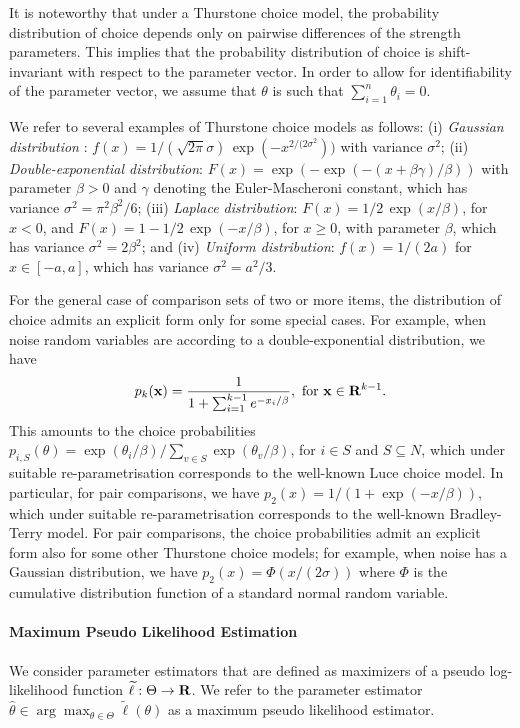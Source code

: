 It is noteworthy that under a Thurstone choice model, the probability distribution of choice depends only on pairwise differences of the strength parameters. This implies that the probability distribution of choice is shift-invariant with respect to the parameter vector. In order to allow for identifiability of the parameter vector, we assume that $\theta$ is such that $\sum_{i=1}^n \theta_i =0$.

We refer to several examples of Thurstone choice models as follows: (i) \emph{Gaussian distribution}  : $f(x) = 1/(\sqrt{2\pi}\sigma)\, \exp(-x^{2/(2\sigma^2}))$ with variance $\sigma^2$; (ii) \emph{Double-exponential distribution}: $F(x) = \exp(-\exp(-(x+\beta\gamma)/\beta))$ with parameter $\beta > 0$ and $\gamma$ denoting the Euler-Mascheroni constant, which has variance $\sigma^2 = \pi^2 \beta^2/6$; (iii) \emph{Laplace distribution}: $F(x) = 1/2\,\exp(x/\beta)$, for $x<0$, and $F(x) = 1-1/2\, \exp(-x/\beta)$, for $x \geq 0$, with parameter $\beta$, which has variance $\sigma^2 = 2 \beta^2$; and (iv) \emph{Uniform distribution}: $f(x) = 1/(2a)$ for $x\in [-a,a]$, which has variance $\sigma^2 = a^2/3$.

For the general case of comparison sets of two or more items, the distribution of choice admits an explicit form only for some special cases. For example, when noise random variables are according to a double-exponential distribution, we have
$$
p_k(\mathbf{x}) = \frac{1}{1+\sum_{i=1}^{k-1}e^{-x_i/\beta}}, \hbox{ for } \mathbf{x} \in \mathbf{R}^{k-1}.
$$
This amounts to the choice probabilities $p_{i,S}(\theta) = \exp(\theta_i/\beta)/\sum_{v\in S} \exp(\theta_v/\beta)$, for $i \in S$ and $S\subseteq N$, which under suitable re-parametrisation corresponds to the well-known Luce choice model. In particular, for pair comparisons, we have $p_2(x) = 1/(1+\exp(-x/\beta))$, which under suitable re-parametrisation corresponds to the well-known Bradley-Terry model. For pair comparisons, the choice probabilities admit an explicit form also for some other Thurstone choice models; for example, when noise has a Gaussian distribution, we have $p_2(x) = \Phi(x/(2\sigma))$ where $\Phi$ is the cumulative distribution function of a standard normal random variable. 

\paragraph{Maximum Pseudo Likelihood Estimation} We consider parameter estimators that are defined as maximizers of a pseudo log-likelihood function $\widetilde{\ell}: \Theta \rightarrow \mathbf{R}$. We refer to the parameter estimator $\widehat{\theta}\in \arg\max_{\theta \in \Theta}\widetilde{\ell}(\theta)$ as a maximum pseudo likelihood estimator.  


